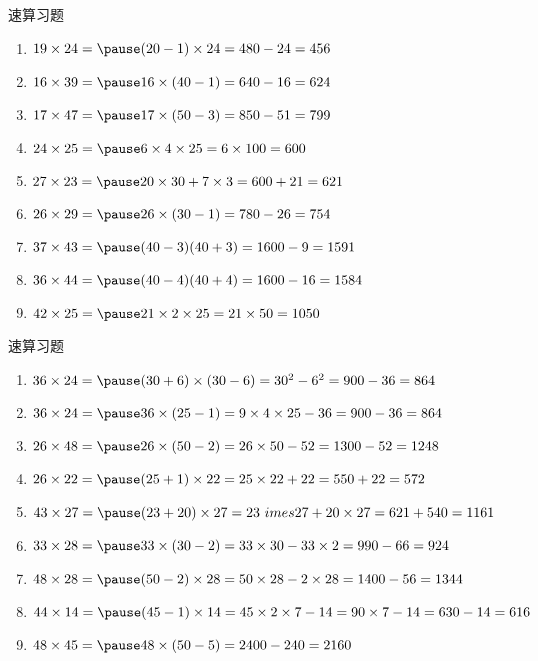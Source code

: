 \documentclass[aspectratio=169]{ctexbeamer} %
\date{\today}
\begin{document}
\begin{frame}[t]{速算习题}
\begin{spacing}{1.2}
\normalsize
\begin{enumerate}[label={\arabic*.}]
\item $ 19 \times 24 = \pause (20-1) \times 24 = 480 - 24 = 456$
\item $ 16 \times 39 = \pause 16 \times (40-1) = 640 - 16 = 624$
\item $ 17 \times 47 = \pause 17 \times (50-3) = 850 - 51 = 799$
\item $ 24 \times 25 = \pause 6 \times 4 \times 25 = 6 \times 100 = 600$
\item $ 27 \times 23 = \pause 20 \times 30 + 7 \times 3 = 600 + 21 = 621$
\item $ 26 \times 29 = \pause 26 \times (30-1) = 780 - 26 = 754$
\item $ 37 \times 43 = \pause (40-3)(40+3) = 1600 - 9 = 1591$
\item $ 36 \times 44 = \pause (40-4)(40+4) = 1600 - 16 = 1584$
\item $ 42 \times 25 = \pause 21 \times 2 \times 25 = 21 \times 50 = 1050$
\end{enumerate}

\end{spacing}
\end{frame}

\begin{frame}[t]{速算习题}
\begin{spacing}{1.2}
\normalsize
\begin{enumerate}[label={\arabic*.}]
\item $ 36 \times 24 = \pause (30+6) \times (30-6) = 30^2 - 6^2 = 900 - 36 = 864$
\item $ 36 \times 24 = \pause 36 \times (25-1) = 9 \times 4 \times 25 - 36 = 900 - 36 = 864$
\item $ 26 \times 48 = \pause 26 \times (50-2) = 26 \times 50 - 52 = 1300 - 52 = 1248$
\item $ 26 \times 22 = \pause (25+1) \times 22 = 25 \times 22 + 22 = 550 + 22 = 572$
\item $ 43 \times 27 = \pause (23+20) \times 27 = 23 \ imes 27 + 20 \times 27 = 621 + 540 = 1161$
\item $ 33 \times 28 = \pause 33 \times (30-2) = 33 \times 30 - 33 \times 2 = 990 - 66 = 924$
\item $ 48 \times 28 = \pause (50-2) \times 28 = 50 \times 28 - 2 \times 28 = 1400 - 56 = 1344$
\item $ 44 \times 14 = \pause (45-1) \times 14 = 45 \times 2 \times 7 - 14 = 90 \times 7 - 14 = 630 - 14 = 616$
\item $ 48 \times 45 = \pause 48 \times (50 - 5) = 2400 - 240 = 2160$
\end{enumerate}

\end{spacing}
\end{frame}
\end{document}
